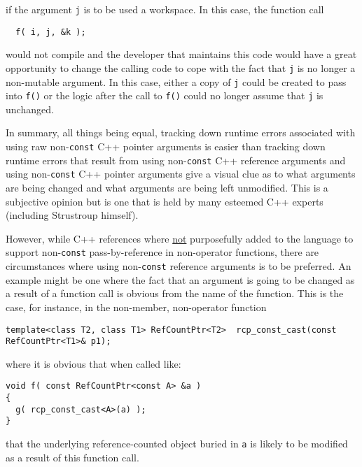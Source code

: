 {}\noindent{}if the argument {}\texttt{j} is to be used a workspace.
In this case, the function call

{\scriptsize\begin{verbatim}
  f( i, j, &k );
\end{verbatim}}

{}\noindent{}would not compile and the developer that maintains this
code would have a great opportunity to change the calling code to cope
with the fact that {}\texttt{j} is no longer a non-mutable argument.
In this case, either a copy of {}\texttt{j} could be created to pass
into {}\texttt{f()} or the logic after the call to {}\texttt{f()}
could no longer assume that {}\texttt{j} is unchanged.

In summary, all things being equal, tracking down runtime errors
associated with using raw non-\texttt{const} C++ pointer arguments is
easier than tracking down runtime errors that result from using
non-\texttt{const} C++ reference arguments and using
non-\texttt{const} C++ pointer arguments give a visual clue as to what
arguments are being changed and what arguments are being left
unmodified.  This is a subjective opinion but is one that is held by
many esteemed C++ experts (including Strustroup himself).

However, while C++ references where {}\underline{not} purposefully
added to the language to support non-\texttt{const} pass-by-reference
in non-operator functions, there are circumstances where using
non-\texttt{const} reference arguments is to be preferred.  An example
might be one where the fact that an argument is going to be changed as
a result of a function call is obvious from the name of the function.
This is the case, for instance, in the non-member, non-operator function

{\scriptsize\begin{verbatim}
template<class T2, class T1> RefCountPtr<T2>  rcp_const_cast(const RefCountPtr<T1>& p1);
\end{verbatim}}

{}\noindent{}where it is obvious that when called like:

{\scriptsize\begin{verbatim}
void f( const RefCountPtr<const A> &a )
{
  g( rcp_const_cast<A>(a) );
}
\end{verbatim}}

{}\noindent{}that the underlying reference-counted object buried in
{}\texttt{a} is likely to be modified as a result of this function
call.

